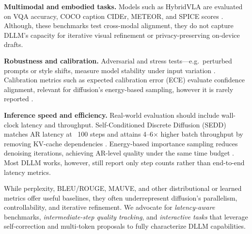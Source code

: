 \noindent\textbf{Multimodal and embodied tasks.}  Models such as HybridVLA are evaluated on VQA accuracy, COCO caption CIDEr, METEOR, and SPICE scores \cite{liu_hybridvla_2025, anderson_spice_2016}.  Although, these benchmarks test cross-modal alignment, they do not capture DLLM’s capacity for iterative visual refinement or privacy-preserving on-device drafts.



\noindent\textbf{Robustness and calibration.}  Adversarial and stress tests—e.g.\ perturbed prompts or style shifts, measure model stability under input variation \cite{eger_robustness_2021}.  Calibration metrics such as expected calibration error (ECE) evaluate confidence alignment, relevant for diffusion’s energy-based sampling, however it is rarely reported \cite{guo_calibration_2017}.



\noindent\textbf{Inference speed and efficiency.} Real-world evaluation should include wall-clock latency and throughput.  Self-Conditioned Discrete Diffusion (SEDD) matches AR latency at ~100 steps and attains 4–6× higher batch throughput by removing KV-cache dependencies \cite{lou_discrete_2024}.  Energy-based importance sampling reduces denoising iterations, achieving AR-level quality under the same time budget \cite{xu_energy-based_2025}.  Most DLLM works, however, still report only step counts rather than end-to-end latency metrics.



While perplexity, BLEU/ROUGE, MAUVE, and other distributional or learned metrics offer useful baselines, they often underrepresent diffusion’s parallelism, controllability, and iterative refinement.  We advocate for \emph{latency-aware} benchmarks, \emph{intermediate-step quality tracking}, and \emph{interactive tasks} that leverage self-correction and multi-token proposals to fully characterize DLLM capabilities.

